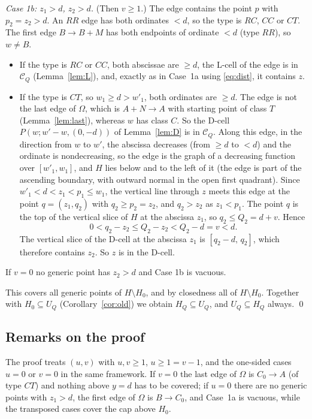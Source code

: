 \emph{Case 1b: $z_1>d$, $z_2>d$.} (Then $v\ge1$.) The edge contains the point $p$ with $p_2=z_2>d$. An $RR$ edge has both ordinates $<d$, so the type is $RC$, $CC$ or $CT$. The first edge $B\to B+M$ has both endpoints of ordinate $<d$ (type $RR$), so $w\ne B$.
\begin{itemize}
\item If the type is $RC$ or $CC$, both abscissae are $\ge d$, the L-cell of the edge is in $\mathcal C_Q$ (Lemma~\ref{lem:L}), and, exactly as in Case~1a using \eqref{eq:dist}, it contains $z$.
\item If the type is $CT$, so $w_1\ge d>w'_1$, both ordinates are $\ge d$. The edge is not the last edge of $\Omega$, which is $A+N\to A$ with starting point of class $T$ (Lemma~\ref{lem:last}), whereas $w$ has class $C$. So the D-cell $P(w;w'-w,(0,-d))$ of Lemma~\ref{lem:D} is in $\mathcal C_Q$. Along this edge, in the direction from $w$ to $w'$, the abscissa decreases (from $\ge d$ to $<d$) and the ordinate is nondecreasing, so the edge is the graph of a decreasing function over $[w'_1,w_1]$, and $H$ lies below and to the left of it (the edge is part of the ascending boundary, with outward normal in the open first quadrant). Since $w'_1<d<z_1<p_1\le w_1$, the vertical line through $z$ meets this edge at the point $q=(z_1,q_2)$ with $q_2\ge p_2=z_2$, and $q_2>z_2$ as $z_1<p_1$. The point $q$ is the top of the vertical slice of $H$ at the abscissa $z_1$, so $q_2\le Q_2=d+v$. Hence
\[
  0<q_2-z_2\le Q_2-z_2<Q_2-d=v<d.
\]
The vertical slice of the D-cell at the abscissa $z_1$ is $[q_2-d,\,q_2]$, which therefore contains $z_2$. So $z$ is in the D-cell.
\end{itemize}
If $v=0$ no generic point has $z_2>d$ and Case 1b is vacuous.

This covers all generic points of $H\setminus H_0$, and by closedness all of $H\setminus H_0$. Together with $H_0\subseteq U_Q$ (Corollary~\ref{cor:old}) we obtain $H_Q\subseteq U_Q$, and $U_Q\subseteq H_Q$ always. \qed

\subsection{Remarks on the proof}

\begin{remark}
The proof treats $(u,v)$ with $u,v\ge1$, $u\ge1=v-1$, and the one-sided cases $u=0$ or $v=0$ in the same framework. If $v=0$ the last edge of $\Omega$ is $C_0\to A$ (of type $CT$) and nothing above $y=d$ has to be covered; if $u=0$ there are no generic points with $z_1>d$, the first edge of $\Omega$ is $B\to C_0$, and Case~1a is vacuous, while the transposed cases cover the cap above $H_0$.
\end{remark}

